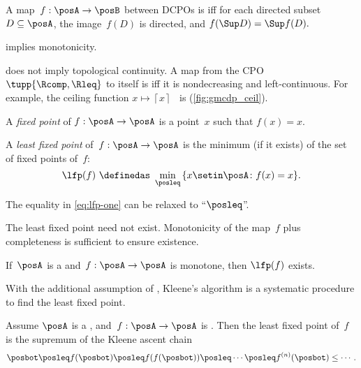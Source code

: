 \begin{definition}[\scottcontinuity]
    \label{def:scott}
    A map~$f:\posA\rightarrow\posB$ between DCPOs is \emph{\scottcontinuous{}} iff for each directed subset~$D\subseteq\posA$, the image~$f(D)$ is directed, and $f(\Sup D)=\Sup f(D).
    $
\end{definition}
\begin{remark}
    \scottcontinuity implies monotonicity.
\end{remark}

\begin{remark}
    \scottcontinuity does not imply topological continuity.
    A map from the CPO $\tupp{\Rcomp,\Rleq}$ to itself is \scottcontinuous iff it is nondecreasing and left-continuous.
    For example, the ceiling function $x\mapsto\left\lceil x\right\rceil $~ is \scottcontinuous (\cref{fig:gmcdp_ceil}).
\end{remark}


A \emph{fixed point} of $f:\posA\to\posA$ is a point~$x$ such that $f(x)=x$.
\begin{definition}
    \label{def:least-fixed}
    A \emph{least fixed point} of~$f:\posA\to\posA$ is the minimum (if it exists) of the set of fixed points of~$f$:
    \begin{equation}
        \label{eq:lfp-one}
        \lfp(f)\,\,\definedas\,\,\min_{\posleq}\,\{x\setin\posA\colon f(x)=x\}.
    \end{equation}

    The equality in \cref{eq:lfp-one} can be relaxed to ``$\posleq$''.
\end{definition}

The least fixed point need not exist.
Monotonicity of the map~$f$ plus completeness is sufficient to ensure existence.

\begin{lemma}
    \label{lem:CPO-fix-point-2}
    If~$\posA$ is a \CPO and~$f:\posA\rightarrow\posA$
    is monotone, then $\lfp(f)$ exists.
\end{lemma}

With the additional assumption of \scottcontinuity, Kleene's algorithm is a systematic procedure to find the least fixed point.

\begin{lemma}
    \label{lem:kleene-1}
    Assume $\posA$ is a \CPO, and~$f:\posA\rightarrow\posA$ is \scottcontinuous.
    Then the least fixed point of~$f$ is the supremum of the Kleene ascent chain
    \begin{equation*}
        \posbot\posleq f(\posbot)\posleq f(f(\posbot))\posleq\cdots\posleq f^{(n)}(\posbot)\leq\cdots.
    \end{equation*}
\end{lemma}
